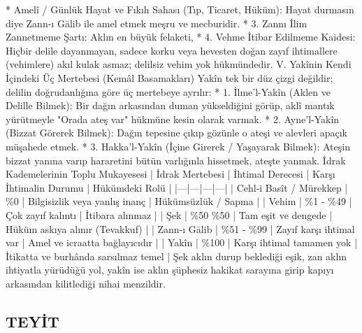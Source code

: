 \documentclass[11pt,a4paper]{article}
\begin{document}
   * Amelî / Günlük Hayat ve Fıkıh Sahası (Tıp, Ticaret, Hüküm): Hayat durmasın diye Zann-ı Gālib ile amel etmek meşru ve mecburidir.
 * 3. Zannı İlim Zannetmeme Şartı:
   Aklın en büyük felaketi, %
 * 4. Vehme İtibar Edilmeme Kaidesi:
   Hiçbir delile dayanmayan, sadece korku veya hevesten doğan zayıf ihtimallere (vehimlere) akıl kulak asmaz; delilsiz vehim yok hükmündedir.
V. Yakînin Kendi İçindeki Üç Mertebesi (Kemâl Basamakları)
Yakîn tek bir düz çizgi değildir; delilin doğrudanlığına göre üç mertebeye ayrılır:
 * 1. İlme'l-Yakîn (Aklen ve Delille Bilmek): Bir dağın arkasından duman yükseldiğini görüp, aklî mantık yürütmeyle "Orada ateş var" hükmüne kesin olarak varmak.
 * 2. Ayne'l-Yakîn (Bizzat Görerek Bilmek): Dağın tepesine çıkıp gözünle o ateşi ve alevleri apaçık müşahede etmek.
 * 3. Hakka'l-Yakîn (İçine Girerek / Yaşayarak Bilmek): Ateşin bizzat yanına varıp hararetini bütün varlığınla hissetmek, ateşte yanmak.
İdrak Kademelerinin Toplu Mukayesesi
| İdrak Mertebesi | İhtimal Derecesi | Karşı İhtimalin Durumu | Hükümdeki Rolü |
|---|---|---|---|
| Cehl-i Basît / Mürekkep | \%0 | Bilgisizlik veya yanlış inanç | Hükümsüzlük / Sapma |
| Vehim | \%1 - \%49 | Çok zayıf kalıntı | İtibara alınmaz |
| Şek | \%50 \leftrightarrow \%50 | Tam eşit ve dengede | Hüküm askıya alınır (Tevakkuf) |
| Zann-ı Gālib | \%51 - \%99 | Zayıf karşı ihtimal var | Amel ve icraatta bağlayıcıdır |
| Yakîn | \%100 | Karşı ihtimal tamamen yok | İtikatta ve burhânda sarsılmaz temel |
Şek aklın durup beklediği eşik, zan aklın ihtiyatla yürüdüğü yol, yakîn ise aklın şüphesiz hakikat sarayına girip kapıyı arkasından kilitlediği nihai menzildir.






\subsection{TEYİT}
\end{document}
